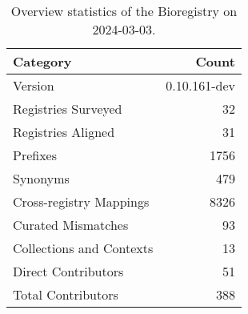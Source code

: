 \begin{table}
\caption{Overview statistics of the Bioregistry on 2024-03-03.}
\label{tab:bioregistry-summary}
\begin{tabular}{lr}
\toprule
Category & Count \\
\midrule
Version & 0.10.161-dev \\
Registries Surveyed & 32 \\
Registries Aligned & 31 \\
Prefixes & 1756 \\
Synonyms & 479 \\
Cross-registry Mappings & 8326 \\
Curated Mismatches & 93 \\
Collections and Contexts & 13 \\
Direct Contributors & 51 \\
Total Contributors & 388 \\
\bottomrule
\end{tabular}
\end{table}

